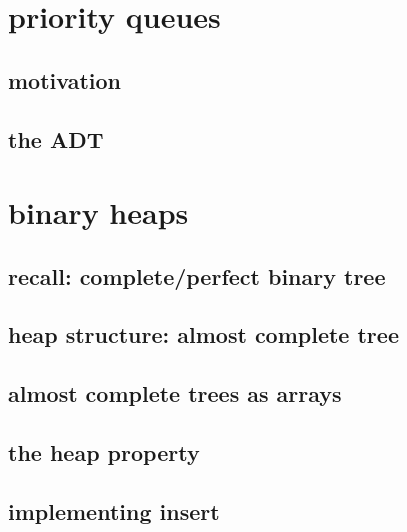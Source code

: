 
\begin{frame}
    \titlepage
\end{frame}

\section{priority queues}

\subsection{motivation}



\subsection{the ADT}



\section{binary heaps}



\subsection{recall: complete/perfect binary tree}



\subsection{heap structure: almost complete tree}



\subsection{almost complete trees as arrays}



\subsection{the heap property}



\subsection{implementing insert}

